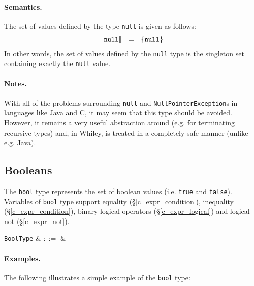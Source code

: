 \paragraph{Semantics.}  The set of values defined by the type \lstinline{null} is given as follows:
\begin{displaymath}
\begin{array}{rcl}
{\tt \llbracket null\rrbracket} & = & {\tt\{null\}}\\
\end{array}
\end{displaymath}
In other words, the set of values defined by the \lstinline{null} type is the singleton set containing exactly the \lstinline{null} value.


\paragraph{Notes.}  With all of the problems surrounding \lstinline{null} and \lstinline{NullPointerException}s in languages like Java and C, it may seem that this type should be avoided. However, it remains a very useful abstraction around (e.g. for terminating recursive types) and, in Whiley, is treated in a completely safe manner (unlike e.g. Java).


\subsection{Booleans}
\label{c_types_bool}

The \lstinline{bool} type represents the set of boolean values (i.e. \lstinline{true} and \lstinline{false}).  Variables of \lstinline{bool} type support equality (\S\ref{c_expr_condition}), inequality (\S\ref{c_expr_condition}), binary logical operators (\S\ref{c_expr_logical}) and logical not (\S\ref{c_expr_not}).

\begin{syntax}
 \verb+BoolType+ & $::=$ &  \\
\end{syntax}

\paragraph{Examples.} The following illustrates a simple example of the \lstinline{bool} type:

